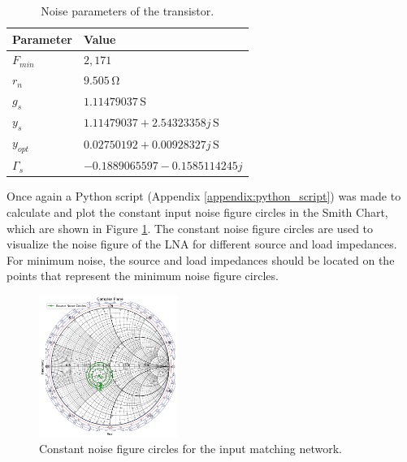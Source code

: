 \begin{table}[H]
    \centering
    \caption{Noise parameters of the transistor.}
    \begin{tabularx}{\textwidth}{>{\centering\arraybackslash}X >{\centering\arraybackslash}X}
        \toprule
        \textbf{Parameter} & \textbf{Value} \\
        \midrule
        $F_{min}$     & $2,171$ \\
        \midrule
        $r_n$     & $9.505\,\si{\ohm}$\\
        \midrule
        $g_s$   & $1.11479037\,\si{\siemens}$ \\
        \midrule
        $y_s$   & $1.11479037+2.54323358j\,\si{\siemens}$ \\
        \midrule
        $y_{opt}$     & $0.02750192+0.00928327j\,\si{\siemens}$\\
        \midrule
        $\Gamma_s$     & $-0.1889065597-0.1585114245j$\\
        \bottomrule
    \end{tabularx}
    \label{tab:NoiseParameters}
\end{table}

Once again a Python script (Appendix \ref{appendix:python_script}) was made to calculate and plot the constant input noise figure circles in the Smith Chart, which are shown in Figure \ref{fig:ConstantNoiseCircles}. The constant noise figure circles are used to visualize the noise figure of the LNA for different source and load impedances. For minimum noise, the source and load impedances should be located on the points that represent the minimum noise figure circles.

\begin{figure}[H]
    \centering
    \includegraphics[width=0.4\textwidth]{Images/ConstantNoiseCircles.png}
    \caption{Constant noise figure circles for the input matching network.}
    \label{fig:ConstantNoiseCircles}
\end{figure}    

